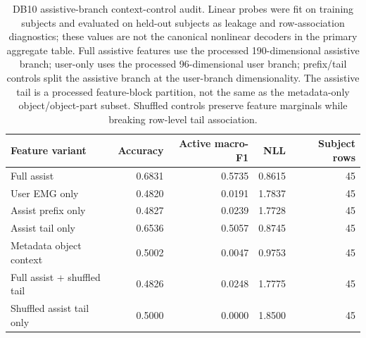 \begin{table}[!t]
\centering
\caption{DB10 assistive-branch context-control audit. Linear probes were fit on training subjects and evaluated on held-out subjects as leakage and row-association diagnostics; these values are not the canonical nonlinear decoders in the primary aggregate table. Full assistive features use the processed 190-dimensional assistive branch; user-only uses the processed 96-dimensional user branch; prefix/tail controls split the assistive branch at the user-branch dimensionality. The assistive tail is a processed feature-block partition, not the same as the metadata-only object/object-part subset. Shuffled controls preserve feature marginals while breaking row-level tail association.}
\label{tab:db10-context-control}
\scriptsize
\setlength{\tabcolsep}{5pt}
\begin{tabular}{lrrrr}
\toprule
Feature variant & Accuracy & Active macro-F1 & NLL & Subject rows \\
\midrule
Full assist & 0.6831 & 0.5735 & 0.8615 & 45 \\
User EMG only & 0.4820 & 0.0191 & 1.7837 & 45 \\
Assist prefix only & 0.4827 & 0.0239 & 1.7728 & 45 \\
Assist tail only & 0.6536 & 0.5057 & 0.8745 & 45 \\
Metadata object context & 0.5002 & 0.0047 & 0.9753 & 45 \\
Full assist + shuffled tail & 0.4826 & 0.0248 & 1.7775 & 45 \\
Shuffled assist tail only & 0.5000 & 0.0000 & 1.8500 & 45 \\
\bottomrule
\end{tabular}
\end{table}
